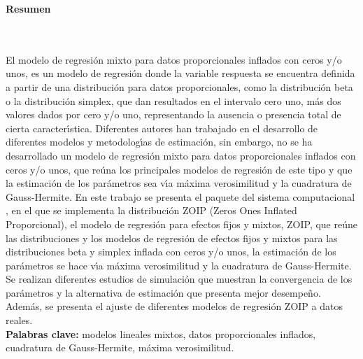 \newpage
\textbf{\LARGE Resumen}
\\\\
El modelo de regresi\'{o}n mixto para datos proporcionales inflados con ceros y/o unos, es un modelo de regresi\'{o}n donde la variable respuesta se encuentra definida a partir de una distribuci\'{o}n para datos proporcionales, como la distribuci\'{o}n beta o la distribuci\'{o}n simplex, que dan resultados en el intervalo cero uno, más dos valores dados por cero y/o uno, representando la ausencia o presencia total de cierta caracter\'{\i}stica. Diferentes autores han trabajado en el desarrollo de diferentes modelos y metodolog\'{\i}as de estimaci\'{o}n, sin embargo, no se ha desarrollado un modelo de regresi\'{o}n mixto para datos proporcionales inflados con ceros y/o unos, que re\'{u}na los principales modelos de regresi\'{o}n de este tipo y que la estimaci\'{o}n de los par\'{a}metros sea v\'{\i}a m\'{a}xima verosimilitud y la cuadratura de Gauss-Hermite. En este trabajo se presenta el paquete  del sistema computacional , en el que se implementa la distribuci\'{o}n ZOIP (Zeros Ones Inflated Proporcional), el modelo de regresi\'{o}n para efectos fijos y mixtos, ZOIP, que re\'{u}ne las distribuciones y los modelos de regresi\'{o}n de efectos fijos y mixtos para las distribuciones beta y simplex inflada con ceros y/o unos, la estimaci\'{o}n de los par\'{a}metros se hace v\'{\i}a m\'{a}xima verosimilitud y la cuadratura de Gauss-Hermite. Se realizan diferentes estudios de simulaci\'{o}n que muestran la convergencia de los par\'{a}metros y la alternativa de estimaci\'{o}n que presenta mejor desempe\~{n}o. Adem\'{a}s, se presenta el ajuste de diferentes modelos de regresi\'{o}n ZOIP a datos reales.\\

\textbf{\small Palabras clave:} modelos lineales mixtos, datos proporcionales inflados, cuadratura de Gauss-Hermite, m\'{a}xima verosimilitud.\\


